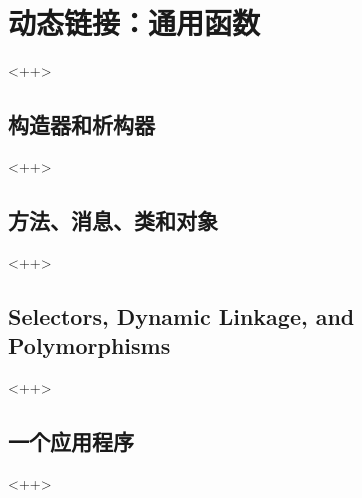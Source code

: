 

\chapter{动态链接：通用函数}
<++>

\section{构造器和析构器}<++>

\section{方法、消息、类和对象}<++>

\section{Selectors, Dynamic Linkage, and Polymorphisms}<++>

\section{一个应用程序}<++>

